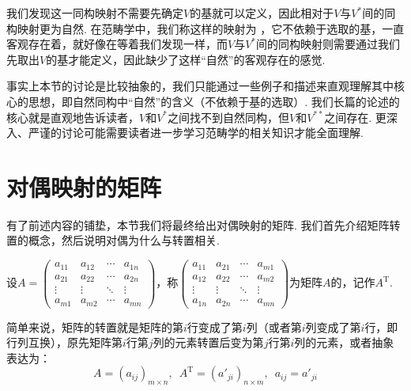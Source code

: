 \begin{solution}

\end{solution}

我们发现这一同构映射不需要先确定$V$的基就可以定义，因此相对于$V$与$V^*$间的同构映射更为自然. 在范畴学中，我们称这样的映射为
，它不依赖于选取的基，一直客观存在着，就好像在等着我们发现一样，而$V$与$V^*$间的同构映射则需要通过我们先取出$V$的基才能定义，因此缺少了这样``自然''的客观存在的感觉.

事实上本节的讨论是比较抽象的，我们只能通过一些例子和描述来直观理解其中核心的思想，即自然同构中``自然''的含义（不依赖于基的选取）. 我们长篇的论述的核心就是直观地告诉读者，$V$和$V^*$之间找不到自然同构，但$V$和$V^{**}$之间存在. 更深入、严谨的讨论可能需要读者进一步学习范畴学的相关知识才能全面理解.

\section{对偶映射的矩阵}

有了前述内容的铺垫，本节我们将最终给出对偶映射的矩阵. 我们首先介绍矩阵转置的概念，然后说明对偶为什么与转置相关.
\begin{definition}[转置] 
    设$A=\begin{pmatrix}
            a_{11} & a_{12} & \cdots & a_{1n} \\
            a_{21} & a_{22} & \cdots & a_{2n} \\
            \vdots & \vdots & \ddots & \vdots \\
            a_{m1} & a_{m2} & \cdots & a_{mn}
        \end{pmatrix}$，称$\begin{pmatrix}
            a_{11} & a_{21} & \cdots & a_{m1} \\
            a_{12} & a_{22} & \cdots & a_{m2} \\
            \vdots & \vdots & \ddots & \vdots \\
            a_{1n} & a_{2n} & \cdots & a_{mn}
        \end{pmatrix}$为矩阵$A$的，记作$A^\mathrm{T}$.
\end{definition}

简单来说，矩阵的转置就是矩阵的第$i$行变成了第$i$列（或者第$i$列变成了第$i$行，即行列互换），原先矩阵第$i$行第$j$列的元素转置后变为第$j$行第$i$列的元素，或者抽象表达为：
\[A=(a_{ij})_{m \times n},\enspace A^\mathrm{T}=(a'_{ji})_{n \times m},\enspace a_{ij}=a'_{ji}\]

